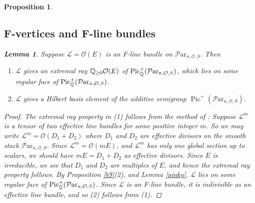 \documentclass[11pt]{amsart}
\newcommand\Pic{\operatorname{Pic}}
\newcommand\ml{\mathcal{L}}
\newcommand\Par{\mathcal{P}\text{ar} }
\newtheorem{proposition}[theorem]{Proposition}
\newtheorem{lemma}[theorem]{Lemma}
\numberwithin{theorem}{subsection}
\begin{document}
{\begin{proposition}
\subsection{F-vertices and F-line bundles}
\begin{lemma}\label{elgar}
Suppose $\ml=\mathcal{O}(E)$  is an F-line bundle on $\Par_{n,\mathcal{O},S}$. Then
\begin{enumerate}
\item $\ml$ gives an extremal ray $\Bbb{Q}_{\geq 0}\mathcal{O}(E)$   of $\Pic^+_{\Bbb{Q}}(\Par_{n,\mathcal{O},S})$, which  lies on some regular face of  $\Pic^+_{\Bbb{Q}}(\Par_{n,\mathcal{O},S})$.
\item $\ml$ gives a Hilbert basis element of the additive semigroup $\Pic^+(\Par_{n,\mathcal{O},S})$.
\end{enumerate}
 \end{lemma}
\begin{proof}
The extremal ray property in (1)  follows from  the method of  \cite[Lemma 2.1]{BHermit}: Suppose
$\ml^m$ is a tensor of two effective line bundles for some positive integer $m$. So we may write
$\ml^m=\mathcal{O}(D_1+D_2)$ where $D_1$ and $D_2$ are effective divisors on the smooth stack $\Par_{n,\mathcal{O},S}$. Since $\ml^m=\mathcal{O}(mE)$, and $\ml^m$ has only one global section up to scalars, we should have $mE=D_1+D_2$ as effective divisors. Since $E$ is irreducible, we see that $D_1$ and $D_2$ are multiples of $E$, and hence the extremal ray property follows. By Proposition \ref{b9}(2), and Lemma \ref{pinky}, $\ml$ lies on some regular face of
$\Pic^+_{\Bbb{Q}}(\Par_{n,\mathcal{O},S})$. Since $\ml$ is an F-line bundle, it is indivisible as an effective line bundle, and so (2) follows from (1).

\end{proof}


\end{proposition}}
\end{document}
